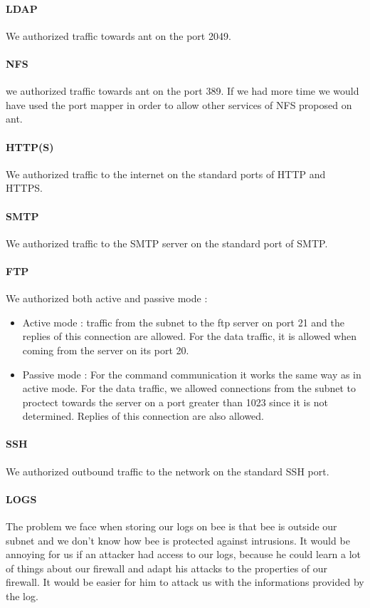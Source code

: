 \documentclass[a4paper,titlepage]{article}
\begin{document}
\paragraph{LDAP} We authorized traffic towards ant on the port 2049.
\paragraph{NFS} we authorized traffic towards ant on the port 389. If we had more time we would have used the port mapper in order to allow other services of NFS proposed on ant.
\paragraph{HTTP(S)} We authorized traffic to the internet on the standard ports of HTTP and HTTPS.
\paragraph{SMTP} We authorized traffic to the SMTP server on the standard port of SMTP.
\paragraph{FTP} We authorized both active and passive mode :
\begin{itemize}
    \item Active mode : traffic from the subnet to the ftp server on port 21 and the replies of this connection are allowed. For the data traffic, it is allowed when coming from the server on its port 20.
    \item Passive mode : For the command communication it works the same way as in active mode. For the data traffic, we allowed connections from the subnet to proctect towards the server on a port greater than 1023 since it is not determined. Replies of this connection are also allowed.
\end{itemize}
\paragraph{SSH} We authorized outbound traffic to the network on the standard SSH port.
\paragraph{LOGS} The problem we face when storing our logs on bee is that bee is outside our subnet and we don't know how bee is protected against intrusions. It would be annoying for us if an attacker had access to our logs, because he could learn a lot of things about our firewall and adapt his attacks to the properties of our firewall. It would be easier for him to attack us with the informations provided by the log.
\end{document}
